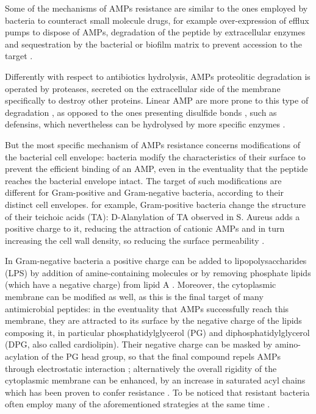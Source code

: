 Some of the mechanisms of AMPs resistance are similar to the ones employed by bacteria to counteract small molecule drugs, for example over-expression of efflux pumps to dispose of AMPs, degradation of the peptide by extracellular enzymes and sequestration by the bacterial or biofilm matrix to prevent accession to the target \citep{Peschel2006}.

Differently with respect to antibiotics hydrolysis, AMPs proteolitic degradation is operated by proteases, secreted on the extracellular side of the membrane specifically to destroy other proteins. Linear AMP are more prone to this type of degradation \citep{Sieprawska-Lupa2004}, as opposed to the ones presenting disulfide bonds \citep{Peschel2006}, such as defensins, which nevertheless can be hydrolysed by more specific enzymes \citep{Nelson2011}.

But the most specific mechanism of AMPs resistance concerns modifications of the bacterial cell envelope: bacteria modify the characteristics of their surface to prevent the efficient binding of an AMP, even in the eventuality that the peptide reaches the bacterial envelope intact. 
%
The target of such modifications are different for Gram-positive and Gram-negative bacteria, according to their distinct cell envelopes.
%
for example, Gram-positive bacteria change the structure of their teichoic acids (TA): D-Alanylation of TA observed in S. Aureus adds a positive charge to it, reducing the attraction of cationic AMPs and in turn increasing the cell wall density, so reducing the surface permeability \citep{Saar-Dover2012}.

In Gram-negative bacteria a positive charge can be added to lipopolysaccharides (LPS) by addition of amine-containing molecules \citep{Moskowitz2004} or by removing phosphate lipids (which have a negative charge) from lipid A \citep{Wang2006lpx}.
%
Moreover, the cytoplasmic membrane can be modified as well, as this is the final target of many antimicrobial peptides: in the eventuality that AMPs successfully reach this membrane, they are attracted to its surface by the negative charge of the lipids composing it, in particular phosphatidylglycerol (PG) and diphosphatidylglycerol (DPG, also called cardiolipin). Their negative charge can be masked by amino-acylation of the PG head group, so that the final compound repels AMPs through electrostatic interaction \citep{Peschel2001}; alternatively the overall rigidity of the cytoplasmic membrane can be enhanced, by an increase in saturated acyl chains which has been proven to confer resistance \citep{Kumariya2015}.
%
To be noticed that resistant bacteria often employ many of the aforementioned strategies at the same time \citep{Band2014}.


